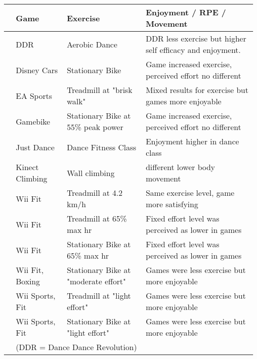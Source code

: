 \begin{tabularx}{\linewidth}{l @{}p{1.3cm}@{} p{2.5cm} X}

\hline
& \textbf{Game}
 & \textbf{Exercise}
 & \textbf{Enjoyment / RPE / Movement}
 \\
\hline
\cite{Gao2013ChildrenSDance}&DDR&Aerobic Dance&DDR less exercise but higher self efficacy and enjoyment.\\
\cite{Haddock_2009}&Disney Cars&Stationary Bike&Game increased exercise, perceived effort no different\\
\cite{Perron2012ComparisonAdults}&EA Sports&Treadmill at "brisk walk"&Mixed results for exercise but games more enjoyable \\
\cite{Monedero2015InteractiveAdults}&Gamebike&Stationary Bike at 55\% peak power&Game increased exercise, perceived effort no different\\
\cite{eason2016comparison}&Just Dance&Dance Fitness Class&Enjoyment higher in dance class\\
\cite{Jenny2015VirtualPerceptions}&Kinect Climbing&Wall climbing&different lower body movement\\
\cite{CebollaIMart2015AlternativeActivos}&Wii Fit&Treadmill at 4.2 km/h&Same exercise level, game more satisfying\\
\cite{Devereaux2012ComparisonExercise}&Wii Fit&Treadmill at 65\% max hr&Fixed effort level was perceived as lower in games\\
\cite{Devereaux2012ComparisonExercise}&Wii Fit&Stationary Bike at 65\% max hr&Fixed effort level was perceived as lower in games\\
\cite{Boese2014ESportsErgometertraining}&Wii Fit, Boxing&Stationary Bike at "moderate effort"&Games were less exercise but more enjoyable\\
\cite{Naugle2014CardiovascularTool}&Wii Sports, Fit&Treadmill at "light effort"&Games were less exercise but more enjoyable\\
\cite{Naugle2014CardiovascularTool}&Wii Sports, Fit&Stationary Bike at "light effort"&Games were less exercise but more enjoyable\\

\hline
& \multicolumn{3}{l}{(DDR = Dance Dance Revolution)}
\end{tabularx}
\vspace{-.7cm}
